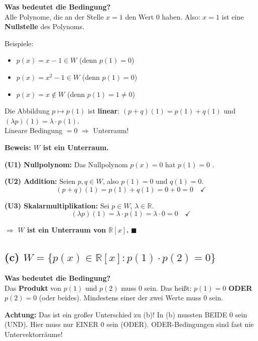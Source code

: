 \documentclass[a4paper,12pt]{article}
\begin{document}
\textbf{Was bedeutet die Bedingung?}\\
Alle Polynome, die an der Stelle $x = 1$ den Wert $0$ haben. Also: $x = 1$ ist eine \textbf{Nullstelle} des Polynoms.

Beispiele:
\begin{itemize}
    \item $p(x) = x - 1 \in W$ \quad (denn $p(1) = 0$)
    \item $p(x) = x^2 - 1 \in W$ \quad (denn $p(1) = 0$)
    \item $p(x) = x \notin W$ \quad (denn $p(1) = 1 \neq 0$)
\end{itemize}

\begin{merkbox}
Die Abbildung $p \mapsto p(1)$ ist \textbf{linear}: $(p + q)(1) = p(1) + q(1)$ und $(\lambda p)(1) = \lambda \cdot p(1)$.\\
Lineare Bedingung $= 0$ $\Rightarrow$ Unterraum!
\end{merkbox}

\textbf{Beweis: $W$ ist ein Unterraum.}

\textbf{(U1) Nullpolynom:} Das Nullpolynom $p(x) = 0$ hat $p(1) = 0$ \checkmark.

\textbf{(U2) Addition:} Seien $p, q \in W$, also $p(1) = 0$ und $q(1) = 0$.
\[
(p + q)(1) = p(1) + q(1) = 0 + 0 = 0 \quad \checkmark
\]

\textbf{(U3) Skalarmultiplikation:} Sei $p \in W$, $\lambda \in \mathbb{R}$.
\[
(\lambda p)(1) = \lambda \cdot p(1) = \lambda \cdot 0 = 0 \quad \checkmark
\]

$\Rightarrow$ \textbf{$W$ ist ein Unterraum von $\mathbb{R}[x]$.} \hfill $\blacksquare$

\subsection*{(c) \quad $W = \{p(x) \in \mathbb{R}[x] : p(1) \cdot p(2) = 0\}$}

\textbf{Was bedeutet die Bedingung?}\\
Das \textbf{Produkt} von $p(1)$ und $p(2)$ muss $0$ sein. Das hei\ss t: $p(1) = 0$ \textbf{ODER} $p(2) = 0$ (oder beides). Mindestens einer der zwei Werte muss $0$ sein.

\textbf{Achtung:} Das ist ein gro\ss er Unterschied zu (b)! In (b) mussten BEIDE $0$ sein (UND). Hier muss nur EINER $0$ sein (ODER). ODER-Bedingungen sind fast nie Untervektorr\"aume!
\end{document}

